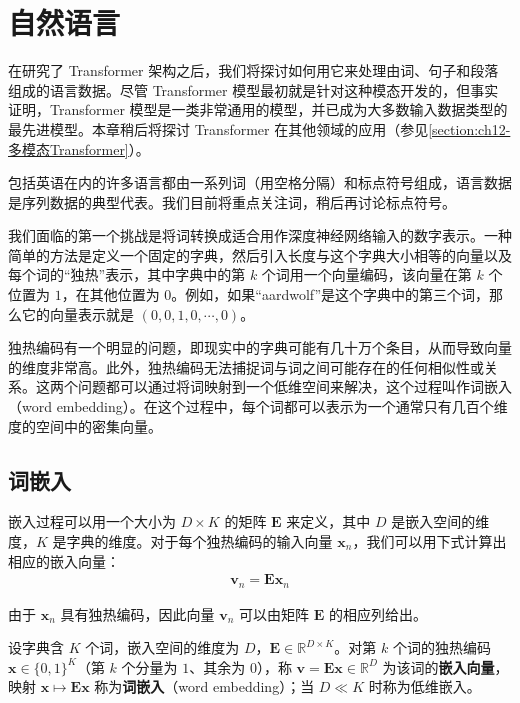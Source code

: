 \documentclass[../../main.tex]{subfiles}
\begin{document}
\section{自然语言}\label{section:ch12-自然语言}

在研究了 Transformer 架构之后，我们将探讨如何用它来处理由词、句子和段落组成的语言数据。尽管 Transformer 模型最初就是针对这种模态开发的，但事实证明，Transformer 模型是一类非常通用的模型，并已成为大多数输入数据类型的最先进模型。本章稍后将探讨 Transformer 在其他领域的应用（参见\cref{section:ch12-多模态Transformer}）。

包括英语在内的许多语言都由一系列词（用空格分隔）和标点符号组成，语言数据是序列数据的典型代表。我们目前将重点关注词，稍后再讨论标点符号。

我们面临的第一个挑战是将词转换成适合用作深度神经网络输入的数字表示。一种简单的方法是定义一个固定的字典，然后引入长度与这个字典大小相等的向量以及每个词的“独热”表示，其中字典中的第 $k$ 个词用一个向量编码，该向量在第 $k$ 个位置为 $1$，在其他位置为 $0$。例如，如果“aardwolf”是这个字典中的第三个词，那么它的向量表示就是 $(0,0,1,0,\cdots,0)$。

独热编码有一个明显的问题，即现实中的字典可能有几十万个条目，从而导致向量的维度非常高。此外，独热编码无法捕捉词与词之间可能存在的任何相似性或关系。这两个问题都可以通过将词映射到一个低维空间来解决，这个过程叫作词嵌入（word embedding）。在这个过程中，每个词都可以表示为一个通常只有几百个维度的空间中的密集向量。

\subsection{词嵌入}\label{subsection:ch12-词嵌入}

嵌入过程可以用一个大小为 $D\times K$ 的矩阵 $\mathbf{E}$ 来定义，其中 $D$ 是嵌入空间的维度，$K$ 是字典的维度。对于每个独热编码的输入向量 $\mathbf{x}_n$，我们可以用下式计算出相应的嵌入向量：
\begin{align}
\mathbf{v}_n=\mathbf{E}\mathbf{x}_n
\label{align:ch12-词嵌入}
\end{align}

由于 $\mathbf{x}_n$ 具有独热编码，因此向量 $\mathbf{v}_n$ 可以由矩阵 $\mathbf{E}$ 的相应列给出。

\begin{definition}[词嵌入]\label{definition:ch12-词嵌入}
设字典含 $K$ 个词，嵌入空间的维度为 $D$，$\mathbf{E}\in\mathbb{R}^{D\times K}$。对第 $k$ 个词的独热编码 $\mathbf{x}\in\{0,1\}^{K}$（第 $k$ 个分量为 $1$、其余为 $0$），称 $\mathbf{v}=\mathbf{E}\mathbf{x}\in\mathbb{R}^{D}$ 为该词的\textbf{嵌入向量}，映射 $\mathbf{x}\mapsto\mathbf{E}\mathbf{x}$ 称为\textbf{词嵌入}（word embedding）；当 $D\ll K$ 时称为低维嵌入。
\end{definition}
\end{document}
